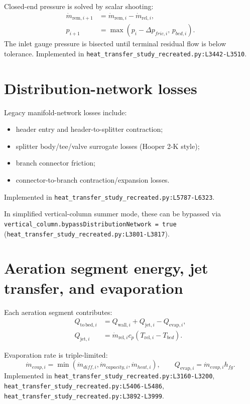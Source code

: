 \documentclass[11pt]{article}
\newcommand{\srcref}[1]{\nolinkurl{#1}}
\newcommand{\code}[1]{\nolinkurl{#1}}
\begin{document}
Closed-end pressure is solved by scalar shooting:
\begin{align}
\dot m_{\mathrm{rem},i+1} &= \dot m_{\mathrm{rem},i} - \dot m_{\mathrm{rel},i}, \\
p_{i+1} &= \max(p_i-\Delta p_{fric,i},\,p_{bed,i}).
\end{align}
The inlet gauge pressure is bisected until terminal residual flow is below
tolerance. Implemented in
\srcref{heat_transfer_study_recreated.py:L3442-L3510}.

\section{Distribution-network losses}
Legacy manifold-network losses include:
\begin{itemize}[leftmargin=*]
\item header entry and header-to-splitter contraction;
\item splitter body/tee/valve surrogate losses (Hooper 2-K style);
\item branch connector friction;
\item connector-to-branch contraction/expansion losses.
\end{itemize}
Implemented in
\srcref{heat_transfer_study_recreated.py:L5787-L6323}.

In simplified vertical-column summer mode, these can be bypassed via
\code{vertical\_column.bypassDistributionNetwork = true}
(\srcref{heat_transfer_study_recreated.py:L3801-L3817}).

\section{Aeration segment energy, jet transfer, and evaporation}
Each aeration segment contributes:
\begin{align}
Q_{\mathrm{to\,bed},i}
&=
Q_{\mathrm{wall},i}
+
Q_{\mathrm{jet},i}
-
Q_{\mathrm{evap},i}, \\
Q_{\mathrm{jet},i}
&= \dot m_{\mathrm{rel},i} c_p (T_{\mathrm{rel},i}-T_{bed}).
\end{align}

Evaporation rate is triple-limited:
\begin{equation}
\dot m_{evap,i}
=
\min\!\left(
\dot m_{diff,i},
\dot m_{capacity,i},
\dot m_{heat,i}
\right),
\qquad
Q_{\mathrm{evap},i}=\dot m_{evap,i} h_{fg}.
\end{equation}
Implemented in
\srcref{heat_transfer_study_recreated.py:L3160-L3200},
\srcref{heat_transfer_study_recreated.py:L5406-L5486},
\srcref{heat_transfer_study_recreated.py:L3892-L3999}.
\end{document}
